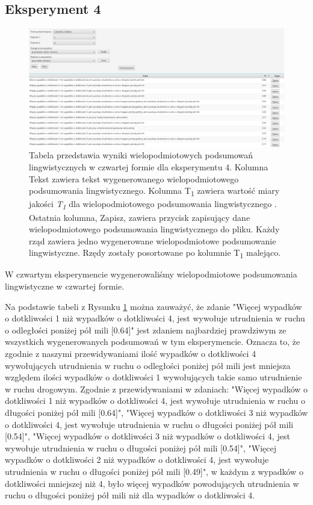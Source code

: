 \documentclass{classrep}
\begin{document}
\newpage
\subsection{Eksperyment 4}
\label{section:ex_wiel4}

\begin{figure}[h!]
\centering
\includegraphics[width=15cm]{ex_wiel4.png}
\vspace{-0.3cm}
\caption{Tabela przedstawia wyniki wielopodmiotowych podsumowań lingwistycznych w czwartej formie dla eksperymentu 4. Kolumna Tekst zawiera tekst wygenerowanego wielopodmiotowego podsumowania lingwistycznego. Kolumna T\textsubscript{1} zawiera wartość miary jakości \textit{T\textsubscript{1}} dla wielopodmiotowego podsumowania lingwistycznego \cite{niewiadomski19}. Ostatnia kolumna, Zapisz, zawiera przycisk zapisujący dane wielopodmiotowego podsumowania lingwistycznego do pliku. Każdy rząd zawiera jedno wygenerowane wielopodmiotowe podsumowanie lingwistyczne. Rzędy zostały posortowane po kolumnie T\textsubscript{1} malejąco. }
\label{wykr_ex_wiel4}
\end{figure}


W czwartym eksperymencie wygenerowaliśmy wielopodmiotowe podsumowania lingwistyczne w czwartej formie.

Na podstawie tabeli z Rysunku \ref{wykr_ex_wiel4} można zauważyć, że zdanie "Więcej wypadków o dotkliwości 1 niż wypadków o dotkliwości 4, jest wywołuje utrudnienia w ruchu o odległości poniżej pół mili [0.64]" jest zdaniem najbardziej prawdziwym ze wszystkich wygenerowanych podsumowań w tym eksperymencie. Oznacza to, że zgodnie z naszymi przewidywaniami ilość wypadków o dotkliwości 4 wywołujących utrudnienia w ruchu o odległości poniżej pół mili jest mniejsza względem ilości wypadków o dotkliwości 1 wywołujących takie samo utrudnienie w ruchu drogowym. Zgodnie z przewidywaniami w zdaniach: 
"Więcej wypadków o dotkliwości 1 niż wypadków o dotkliwości 4, jest wywołuje utrudnienia w ruchu o długości poniżej pół mili [0.64]", "Więcej wypadków o dotkliwości 3 niż wypadków o dotkliwości 4, jest wywołuje utrudnienia w ruchu o długości poniżej pół mili [0.54]", "Więcej wypadków o dotkliwości 3 niż wypadków o dotkliwości 4, jest wywołuje utrudnienia w ruchu o długości poniżej pół mili [0.54]", "Więcej wypadków o dotkliwości 2 niż wypadków o dotkliwości 4, jest wywołuje utrudnienia w ruchu o długości poniżej pół mili [0.49]", w każdym z wypadków o dotkliwości mniejszej niż 4, było więcej wypadków powodujących utrudnienia w ruchu o długości poniżej pół mili niż dla wypadków o dotkliwości 4. 
\end{document}
